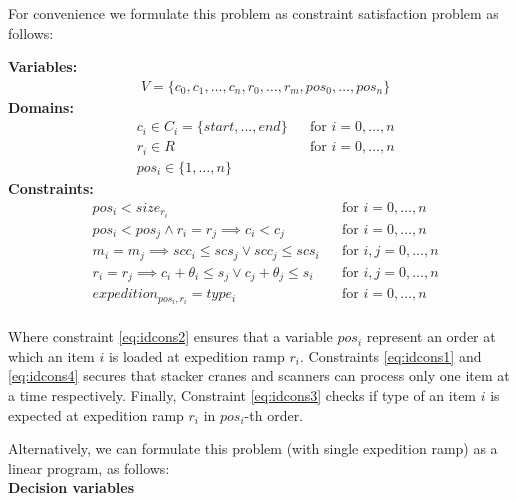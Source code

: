 \documentclass{ctuthesis}
\begin{document}
For convenience we formulate this problem as constraint satisfaction problem as follows:

\textbf{Variables:}
\begin{align}
    &V = \{c_{0}, c_{1}, \ldots, c_{n},r_0, \ldots, r_m, pos_0, \ldots, pos_n\}
\end{align}
\textbf{Domains:}
\begin{align}
&c_{i} \in C_i = \{start, ..., end\} && \text{for } i=0,\ldots,n\\
&r_{i} \in R && \text{for } i=0,\ldots,n\\
&pos_i \in \{1, \ldots, n\}
\end{align}
\textbf{Constraints:}
 \begin{align}
& pos_i < size_{r_i} && \text{for } i=0,\ldots,n \nonumber \\
& pos_i < pos_j \land r_i = r_j \implies c_i < c_j && \text{for } i=0,\ldots,n\\ \label{eq:idcons2}
& m_i = m_j \implies scc_i \leq scs_j \lor scc_j \leq scs_i && \text{for } i,j=0,\ldots,n\\ \label{eq:idcons1}
& r_i = r_j \implies c_i  + \theta_i \leq s_j \lor c_j + \theta_j \leq s_i && \text{for } i,j=0,\ldots,n\\ \label{eq:idcons4}
& expedition_{pos_i,r_i} = type_i  && \text{for } i=0,\ldots,n\\ \label{eq:idcons3}
\end{align}

Where constraint \ref{eq:idcons2} ensures that a variable $pos_i$ represent an order at which an item $i$ is loaded at expedition ramp $r_i$. Constraints \ref{eq:idcons1} and \ref{eq:idcons4} secures that stacker cranes and scanners can process only one item at a time respectively. Finally, Constraint \ref{eq:idcons3} checks if type of an item $i$ is expected at expedition ramp $r_i$ in $pos_i$-th order.
  
Alternatively, we can formulate this problem (with single expedition ramp) as a linear program, as follows:\\
\textbf{Decision variables}
\end{document}
